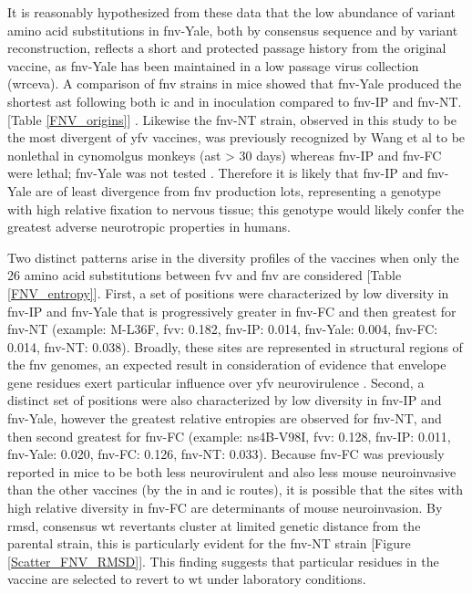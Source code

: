 It is reasonably hypothesized from these data that the low abundance of variant amino acid substitutions in \gls{fnv}-Yale, both by consensus sequence and by variant reconstruction, reflects a short and protected passage history from the original vaccine, as \gls{fnv}-Yale has been maintained in a low passage virus collection (\gls{wrceva}). A comparison of \gls{fnv} strains in mice showed that \gls{fnv}-Yale produced the shortest \gls{ast} following both \gls{ic} and \gls{in} inoculation compared to \gls{fnv}-IP and \gls{fnv}-NT. [Table \ref{FNV_origins}] \parencite{Wang:1995vu}. Likewise the \gls{fnv}-NT strain, observed in this study to be the most divergent of \gls{yfv} vaccines, was previously recognized by Wang et al to be nonlethal in cynomolgus monkeys (\gls{ast} > 30 days) whereas \gls{fnv}-IP and \gls{fnv}-FC were lethal; \gls{fnv}-Yale was not tested \parencite{Wang:1995vu}. Therefore it is likely that \gls{fnv}-IP and \gls{fnv}-Yale are of least divergence from \gls{fnv} production lots, representing a genotype with high relative fixation to nervous tissue; this genotype would likely confer the greatest adverse neurotropic properties in humans.

Two distinct patterns arise in the diversity profiles of the vaccines when only the 26 amino acid substitutions between \gls{fvv} and \gls{fnv} are considered [Table \ref{FNV_entropy}]. First, a set of positions were characterized by low diversity in \gls{fnv}-IP and \gls{fnv}-Yale that is progressively greater in \gls{fnv}-FC and then greatest for \gls{fnv}-NT (example: M-L36F, \gls{fvv}: 0.182, \gls{fnv}-IP: 0.014, \gls{fnv}-Yale: 0.004, \gls{fnv}-FC: 0.014, \gls{fnv}-NT: 0.038). Broadly, these sites are represented in structural regions of the \gls{fnv} genomes, an expected result in consideration of evidence that envelope gene residues exert particular influence over \gls{yfv} neurovirulence \parencite{Ni:2000un}. Second, a distinct set of positions were also characterized by low diversity in \gls{fnv}-IP and \gls{fnv}-Yale, however the greatest relative entropies are observed for \gls{fnv}-NT, and then second greatest for \gls{fnv}-FC (example: \gls{ns}4B-V98I, \gls{fvv}: 0.128, \gls{fnv}-IP: 0.011, \gls{fnv}-Yale: 0.020, \gls{fnv}-FC: 0.126, \gls{fnv}-NT: 0.033). Because \gls{fnv}-FC was previously reported in mice to be both less neurovirulent and also less mouse neuroinvasive than the other vaccines (by the \gls{in} and \gls{ic} routes), it is possible that the sites with high relative diversity in \gls{fnv}-FC are determinants of mouse neuroinvasion. By \gls{rmsd}, consensus \gls{wt} revertants cluster at limited genetic distance from the parental strain, this is particularly evident for the \gls{fnv}-NT strain [Figure \ref{Scatter_FNV_RMSD}]. This finding suggests that particular residues in the vaccine are selected to revert to \gls{wt} under laboratory conditions.

